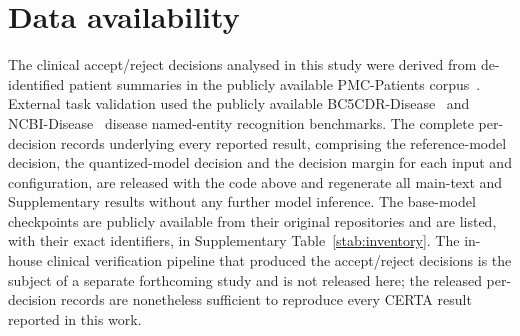\section*{Data availability}

The clinical accept/reject decisions analysed in this study were derived from de-identified patient
summaries in the publicly available PMC-Patients corpus~\cite{zhao2023large}. External task validation
used the publicly available BC5CDR-Disease~\cite{li2016bc5cdr} and NCBI-Disease~\cite{dogan2014ncbi}
disease named-entity recognition benchmarks. The complete per-decision records underlying every reported
result, comprising the reference-model decision, the quantized-model decision and the decision margin for
each input and configuration, are released with the code above and regenerate all main-text and
Supplementary results without any further model inference. The base-model checkpoints are publicly
available from their original repositories and are listed, with their exact identifiers, in Supplementary
Table~\ref{stab:inventory}. The in-house clinical verification pipeline that produced the accept/reject
decisions is the subject of a separate forthcoming study and is not released here; the released
per-decision records are nonetheless sufficient to reproduce every CERTA result reported in this work.
